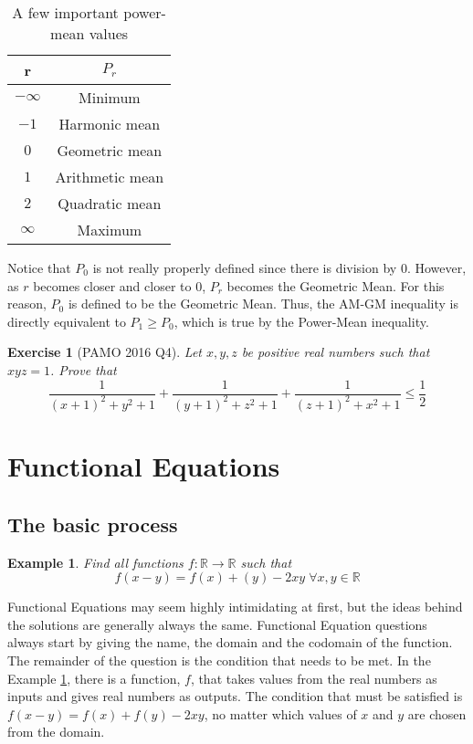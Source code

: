 \documentclass[a4paper,12pt]{article}
\newtheorem{example}{Example}[section]
\newtheorem{exercise}{Exercise}[section]
\begin{document}
\begin{table}[ht]
    \caption{A few important power-mean values}
    \centering
\begin{tabular}{|c|c|}
\hline
r                         & $P_r$            \\
\hline
$-\infty$                 & Minimum         \\
\hline
$-1$                      & Harmonic mean   \\
\hline
$0$                       & Geometric mean  \\
\hline
$1$                       & Arithmetic mean \\
\hline
$2$                       & Quadratic mean  \\
\hline
$\infty$                  & Maximum \\
\hline       
\end{tabular}
\end{table}

Notice that $P_0$ is not really properly defined since there is division by $0$. However, as $r$ becomes closer and closer to $0$, $P_r$ becomes the Geometric Mean. For this reason, $P_0$ is defined to be the Geometric Mean. Thus, the AM-GM inequality is directly equivalent to $P_1 \geq P_0$, which is true by the Power-Mean inequality.


\begin{exercise}[PAMO 2016 Q4]
    Let $x, y, z$ be positive real numbers such that $xyz = 1$. Prove that
    $$ \frac{1}{(x + 1)^2 + y^2 + 1} + \frac{1}{(y + 1)^2 + z^2 + 1} + \frac{1}{(z + 1)^2 + x^2 + 1} \le \frac{1}{2}$$
\end{exercise}
\clearpage

\section{Functional Equations}
\subsection{The basic process}
\begin{example}
    \label{funcex}
    Find all functions $f: \mathbb{R} \rightarrow \mathbb{R}$ such that $$f(x - y) = f(x) + (y) - 2xy\; \forall x, y \in \mathbb{R}$$
\end{example}

Functional Equations may seem highly intimidating at first, but the ideas behind the solutions are generally always the same.
Functional Equation questions always start by giving the name, the domain and the codomain of the function. The remainder of the question is the condition that needs to be met.
In the Example \ref{funcex}, there is a function, $f$, that takes values from the real numbers as inputs and gives real numbers as outputs. The condition that must be satisfied is $f(x - y) = f(x) + f(y) - 2xy$, no matter which values of $x$ and $y$ are chosen from the domain. \\
\end{document}
